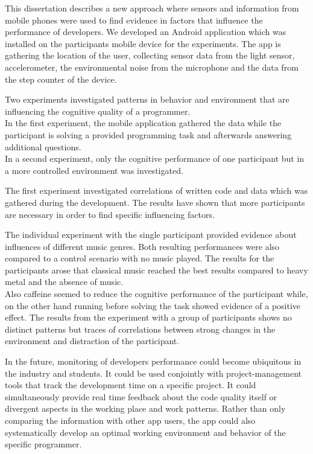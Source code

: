 \bigbreak
This dissertation describes a new approach where sensors and information from mobile phones were used to find evidence in factors that influence the performance of developers. 
We developed an Android application which was installed on the participants mobile device for the experiments. The app is gathering the location of the user, collecting sensor data from the light sensor, accelerometer, the environmental noise from the microphone and the data from the step counter of the device. \bigbreak

Two experiments investigated patterns in behavior and environment that are influencing the cognitive quality of a programmer. \\
In the first experiment, the mobile application gathered the data while the participant is solving a provided programming task and afterwards answering additional questions. \\
In a second experiment, only  the cognitive performance of one participant but in a more controlled environment was investigated. 

The first experiment investigated correlations of written code and data which was gathered during the development. The results have shown that more participants are necessary in order to find specific influencing factors. 

The individual experiment with the single participant provided evidence about influences of different music genres. Both resulting performances were also compared to a control scenario with no music played. The results for the participants arose that classical music reached the best results compared to heavy metal and the absence of music.\\
Also caffeine seemed to reduce the cognitive performance of the participant while, on the other hand running before solving the task showed evidence of a positive effect.
The results from the experiment with a group of participants shows no distinct patterns but traces of correlations between strong changes in the environment and distraction of the participant.  

\bigbreak
In the future, monitoring of developers performance could become ubiquitous in the industry and students. It could be used conjointly with project-management tools that track the development time on a specific project. It could simultaneously provide real time feedback about the code quality itself or divergent aspects in the working place and work patterns. Rather than only comparing the information with other app users, the app could also systematically develop an optimal working environment and behavior of the specific programmer.

